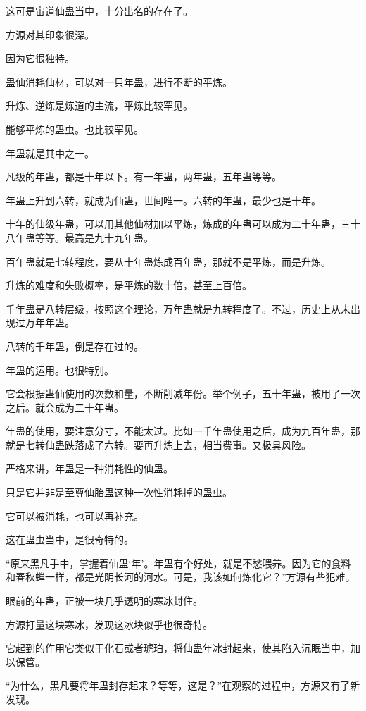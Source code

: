 \begin{this_body}
这可是宙道仙蛊当中，十分出名的存在了。

方源对其印象很深。

因为它很独特。

蛊仙消耗仙材，可以对一只年蛊，进行不断的平炼。

升炼、逆炼是炼道的主流，平炼比较罕见。

能够平炼的蛊虫。也比较罕见。

年蛊就是其中之一。

凡级的年蛊，都是十年以下。有一年蛊，两年蛊，五年蛊等等。

年蛊上升到六转，就成为仙蛊，世间唯一。六转的年蛊，最少也是十年。

十年的仙级年蛊，可以用其他仙材加以平炼，炼成的年蛊可以成为二十年蛊，三十八年蛊等等。最高是九十九年蛊。

百年蛊就是七转程度，要从十年蛊炼成百年蛊，那就不是平炼，而是升炼。

升炼的难度和失败概率，是平炼的数十倍，甚至上百倍。

千年蛊是八转层级，按照这个理论，万年蛊就是九转程度了。不过，历史上从未出现过万年年蛊。

八转的千年蛊，倒是存在过的。

年蛊的运用。也很特别。

它会根据蛊仙使用的次数和量，不断削减年份。举个例子，五十年蛊，被用了一次之后。就会成为二十年蛊。

年蛊的使用，要注意分寸，不能太过。比如一千年蛊使用之后，成为九百年蛊，那就是七转仙蛊跌落成了六转。要再升炼上去，相当费事。又极具风险。

严格来讲，年蛊是一种消耗性的仙蛊。

只是它并非是至尊仙胎蛊这种一次性消耗掉的蛊虫。

它可以被消耗，也可以再补充。

这在蛊虫当中，是很奇特的。

“原来黑凡手中，掌握着仙蛊‘年’。年蛊有个好处，就是不愁喂养。因为它的食料和春秋蝉一样，都是光阴长河的河水。可是，我该如何炼化它？”方源有些犯难。

眼前的年蛊，正被一块几乎透明的寒冰封住。

方源打量这块寒冰，发现这冰块似乎也很奇特。

它起到的作用它类似于化石或者琥珀，将仙蛊年冰封起来，使其陷入沉眠当中，加以保管。

“为什么，黑凡要将年蛊封存起来？等等，这是？”在观察的过程中，方源又有了新发现。


\end{this_body}
